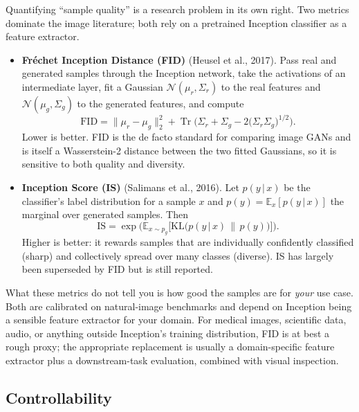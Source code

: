 \documentclass[11pt]{article}
\newcommand{\E}{\mathbb{E}}
\newcommand{\KL}{\mathrm{KL}}
\newcommand{\given}{\,\vert\,}
\theoremstyle{remark}
\begin{document}
Quantifying ``sample quality'' is a research problem in its own right. Two metrics dominate the image literature; both rely on a pretrained Inception classifier as a feature extractor.
\begin{itemize}
    \item \textbf{Fr\'echet Inception Distance (FID)} (Heusel et al., 2017). Pass real and generated samples through the Inception network, take the activations of an intermediate layer, fit a Gaussian $\mathcal{N}(\mu_r,\Sigma_r)$ to the real features and $\mathcal{N}(\mu_g,\Sigma_g)$ to the generated features, and compute
    \[
    \mathrm{FID} = \|\mu_r-\mu_g\|_2^2 + \operatorname{Tr}\!\Big(\Sigma_r+\Sigma_g-2\big(\Sigma_r\Sigma_g\big)^{1/2}\Big).
    \]
    Lower is better. FID is the de facto standard for comparing image GANs and is itself a Wasserstein-2 distance between the two fitted Gaussians, so it is sensitive to both quality and diversity.
    \item \textbf{Inception Score (IS)} (Salimans et al., 2016). Let $p(y\given x)$ be the classifier's label distribution for a sample $x$ and $p(y)=\E_x[p(y\given x)]$ the marginal over generated samples. Then
    \[
    \mathrm{IS} = \exp\Big(\E_{x\sim p_g}\big[\KL\big(p(y\given x)\,\|\,p(y)\big)\big]\Big).
    \]
    Higher is better: it rewards samples that are individually confidently classified (sharp) and collectively spread over many classes (diverse). IS has largely been superseded by FID but is still reported.
\end{itemize}
What these metrics do not tell you is how good the samples are for \emph{your} use case. Both are calibrated on natural-image benchmarks and depend on Inception being a sensible feature extractor for your domain. For medical images, scientific data, audio, or anything outside Inception's training distribution, FID is at best a rough proxy; the appropriate replacement is usually a domain-specific feature extractor plus a downstream-task evaluation, combined with visual inspection.

\subsection{Controllability}
\end{document}
